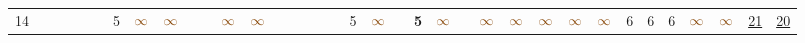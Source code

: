 \begin{landscape}
\begin{table}
\begin{adjustwidth}{-2.6cm}{}
{\begin{tabular}{l|lllllllllllllllllllllllllllllllll|ll}
		14   &            &                                                                 &                                                                 &                                                                 &                                                                 & 5                                                               & $\textcolor[rgb]{0.541,0.29,0.043}{\infty}$ & $\textcolor[rgb]{0.541,0.29,0.043}{\infty}$ &                                                                 &                                                                 & $\textcolor[rgb]{0.541,0.29,0.043}{\infty}$ & $\textcolor[rgb]{0.541,0.29,0.043}{\infty}$ &                                                                 &                                                                 &                                                                 &                                                                 &                                                                 & 5                                                               & $\textcolor[rgb]{0.541,0.29,0.043}{\infty}$ &                                                                 & \textbf{5}                                                      & $\textcolor[rgb]{0.541,0.29,0.043}{\infty}$ &                                                                 & $\textcolor[rgb]{0.541,0.29,0.043}{\infty}$ & $\textcolor[rgb]{0.541,0.29,0.043}{\infty}$ & $\textcolor[rgb]{0.541,0.29,0.043}{\infty}$ & $\textcolor[rgb]{0.541,0.29,0.043}{\infty}$ & $\textcolor[rgb]{0.541,0.29,0.043}{\infty}$ & 6                                                               & 6                                                               & 6                                                               & $\textcolor[rgb]{0.541,0.29,0.043}{\infty}$ & $\textcolor[rgb]{0.541,0.29,0.043}{\infty}$ & \uline{21} & \uline{20}  \\

\end{tabular}}
\end{adjustwidth}
\end{table}
\end{landscape}
